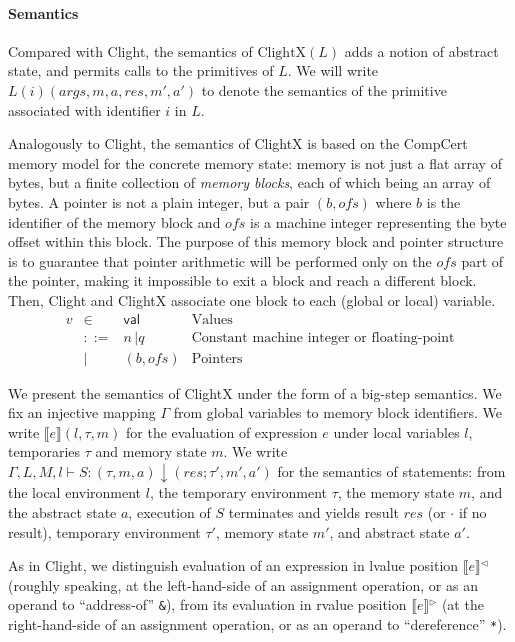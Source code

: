 \paragraph{Semantics}

Compared with Clight, the semantics of $\text{ClightX}(L)$ adds a
notion of abstract state, and permits calls to the primitives of $L$.
We will write $L(i)(\mathit{args}, m, a, \mathit{res}, m', a')$ to
denote the semantics of the primitive associated with identifier $i$
in $L$.


Analogously to Clight, the semantics of ClightX is based on the
CompCert memory model \cite{leroy08} for the concrete memory state:
memory is not just a flat array of bytes, but a finite collection of
\emph{memory blocks}, each of which being an array of bytes.  A
pointer is not a plain integer, but a pair $(b, \mathit{ofs})$ where
$b$ is the identifier of the memory block and $\mathit{ofs}$ is a
machine integer representing the byte offset within this block. The
purpose of this memory block and pointer structure is to guarantee
that pointer arithmetic will be performed only on the $\mathit{ofs}$
part of the pointer, making it impossible to exit a block and reach a
different block. Then, Clight and ClightX associate one block to each
(global or local) variable.
\[
\begin{array}{llll}
v & \in & \textsf{val} & \text{Values} \\
& ::= & n \, | q & \text{Constant machine integer or floating-point} \\
& | & (b, \mathit{ofs}) & \text{Pointers}
\end{array}
\]


We present the semantics of ClightX under the form of a big-step
semantics. We fix an injective mapping $\Gamma$ from global variables
to memory block identifiers.
We write $\llbracket e \rrbracket(l, \tau, m)$ for the
  evaluation of expression $e$ under local variables $l$,
  temporaries $\tau$ and memory state $m$.
We write $\Gamma, L, M, l \vdash S:
(\tau, m, a) \downarrow (\mathit{res}; \tau', m', a')$
for the semantics of statements:
from the local environment $l$, the temporary environment $\tau$, the
memory state $m$, and the abstract state $a$, execution of $S$
terminates and yields result $\mathit{res}$ (or $\cdot$ if no result),
temporary environment $\tau'$, memory state $m'$, and abstract state
$a'$.


As in Clight, we distinguish evaluation of an expression in lvalue
position $\llbracket{} e \rrbracket{}^\triangleleft$ (roughly
speaking, at the left-hand-side of an assignment operation, or as an
operand to ``address-of'' \texttt{\&}), from its evaluation in rvalue
position $\llbracket{} e \rrbracket{}^\triangleright$ (at the
right-hand-side of an assignment operation, or as an operand to
``dereference'' \texttt{*}).

